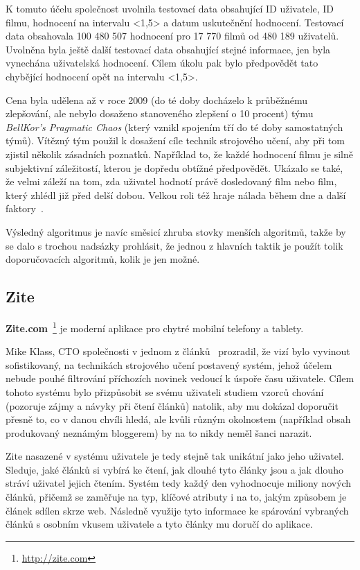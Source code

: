 \documentclass[thesis=M,czech]{FITthesis}[2014/05/07]
\begin{document}
K tomuto účelu společnost uvolnila testovací data obsahující ID uživatele, ID filmu, hodnocení na intervalu <1,5> a datum uskutečnění hodnocení. Testovací data obsahovala 100 480 507 hodnocení pro 17 770 filmů od 480 189 uživatelů. Uvolněna byla ještě další testovací data obsahující stejné informace, jen byla vynechána uživatelská hodnocení. Cílem úkolu pak bylo předpovědět tato chybějící hodnocení opět na intervalu <1,5>.

Cena byla udělena až v roce 2009 (do té doby docházelo k průběžnému zlepšování, ale nebylo dosaženo stanoveného zlepšení o 10 procent) týmu \emph{BellKor's Pragmatic Chaos} (který vznikl spojením tří do té doby samostatných týmů). Vítězný tým použil k dosažení cíle technik strojového učení, aby při tom zjistil několik zásadních poznatků. Například to, že každé hodnocení filmu je silně subjektivní záležitostí, kterou je dopředu obtížné předpovědět. Ukázalo se také, že velmi záleží na tom, zda uživatel hodnotí právě dosledovaný film nebo film, který zhlédl již před delší dobou. Velkou roli též hraje nálada během dne a další faktory~\cite{bellkor}.

Výsledný algoritmus je navíc směsicí zhruba stovky menších algoritmů, takže by se dalo s trochou nadsázky prohlásit, že jednou z hlavních taktik je použít tolik doporučovacích algoritmů, kolik je jen možné. 

\subsection{Zite}

\textbf{Zite.com}~\footnote{\url{http://zite.com}} je moderní aplikace pro chytré mobilní telefony a tablety.

Mike Klass, CTO společnosti v jednom z článků~\cite{ziteflip} prozradil, že vizí bylo vyvinout sofistikovaný, na technikách strojového učení postavený systém, jehož účelem nebude pouhé filtrování příchozích novinek vedoucí k úspoře času uživatele. Cílem tohoto systému bylo přizpůsobit se svému uživateli studiem vzorců chování (pozoruje zájmy a návyky při čtení článků) natolik, aby mu dokázal doporučit přesně to, co v danou chvíli hledá, ale kvůli různým okolnostem (například obsah produkovaný neznámým bloggerem) by na to nikdy neměl šanci narazit.

Zite nasazené v systému uživatele je tedy stejně tak unikátní jako jeho uživatel. Sleduje, jaké článků si vybírá ke čtení, jak dlouhé tyto články jsou a jak dlouho stráví uživatel jejich čtením. Systém tedy každý den vyhodnocuje miliony nových článků, přičemž se zaměřuje na typ, klíčové atributy i na to, jakým způsobem je článek sdílen skrze web. Následně využije tyto informace ke spárování vybraných článků s osobním vkusem uživatele a tyto články mu doručí do aplikace. 
\end{document}
